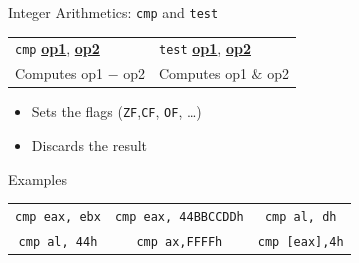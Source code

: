 \documentclass[]{beamer}
\begin{document}
\begin{frame}{Integer Arithmetics: {\tt cmp} and {\tt test}}
\begin{table}
	\centering
\begin{tabular}{l|l}
{\tt cmp} \underline{\textbf{op1}}, \underline{\textbf{op2}} & {\tt test} \underline{\textbf{op1}}, \underline{\textbf{op2}} \\
Computes op1 $-$ op2 & Computes op1 $\&$ op2 \\
\end{tabular}
\end{table}
  \begin{itemize}
	  \item Sets the flags ({\tt ZF},{\tt CF}, {\tt OF}, \dots)
	  \item Discards the result
  \end{itemize}

  \begin{block}{Examples}
  	\centering
      \begin{tabular}{c|c|c}
        {\tt cmp eax, ebx} & {\tt cmp eax, 44BBCCDDh} & {\tt cmp al, dh}\\[.4em]
        {\tt cmp al, 44h}&{\tt cmp ax,FFFFh} & {\tt cmp [eax],4h}\\
      \end{tabular}
  \end{block}
\end{frame}
\end{document}
